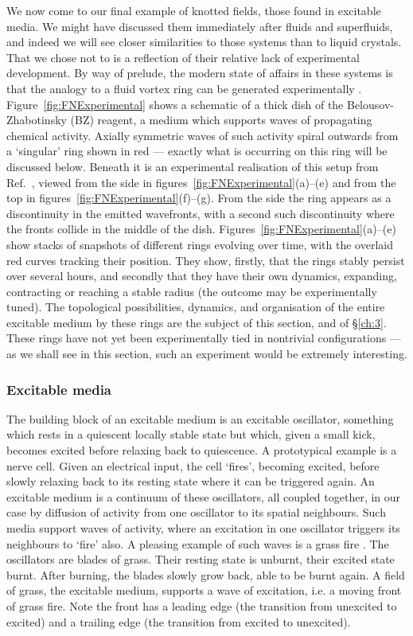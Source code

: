 We now come to our final example of knotted fields, those found in excitable media. We might have discussed them immediately after fluids and superfluids, and indeed we will see closer similarities to those systems than to liquid crystals. That we chose not to is a reflection of their relative lack of experimental development. By way of prelude, the modern state of affairs in these systems is that the analogy to a fluid vortex ring can be generated experimentally \citep{Steinbock2006,Azhand2014, Totz2015}. Figure~\ref{fig:FNExperimental} shows a schematic of a thick dish of the Belousov-Zhabotinsky (BZ) reagent, a medium which supports waves of propagating chemical activity. Axially symmetric waves of such activity spiral outwards from a `singular' ring shown in red --- exactly what is occurring on this ring will be discussed below. Beneath it is an experimental realisation of this setup from Ref.~\citep{Totz2015}, viewed from the side in figures~\ref{fig:FNExperimental}(a)--(e) and from the top in figures~\ref{fig:FNExperimental}(f)--(g). From the side the ring appears as a discontinuity in the emitted wavefronts, with a second such discontinuity where the fronts collide in the middle of the dish. Figures~\ref{fig:FNExperimental}(a)--(e) show stacks of snapshots of different rings evolving over time, with the overlaid red curves tracking their position. They show, firstly, that the rings stably persist over several hours, and secondly that they have their own dynamics, expanding, contracting or reaching a stable radius (the outcome may be experimentally tuned). The topological possibilities, dynamics, and organisation of the entire excitable medium by these rings are the subject of this section, and of \S \ref{ch:3}. These rings have not yet been experimentally tied in nontrivial configurations --- as we shall see in this section, such an experiment would be extremely interesting.

\subsubsection{Excitable media}

The building block of an excitable medium is an excitable oscillator, something which rests in a quiescent locally stable state but which, given a small kick, becomes excited before relaxing back to quiescence. A prototypical example is a nerve cell. Given an electrical input, the cell `fires', becoming excited, before slowly relaxing back to its resting state where it can be triggered again. An excitable medium is a continuum of these oscillators, all coupled together, in our case by diffusion of activity from one oscillator to its spatial neighbours. Such media support waves of activity, where an excitation in one oscillator triggers its neighbours to `fire' also. A pleasing example of such waves is a grass fire \citep{Winfree1983}. The oscillators are blades of grass. Their resting state is unburnt, their excited state burnt. After burning, the blades slowly grow back, able to be burnt again. A field of grass, the excitable medium, supports a wave of excitation, i.e. a moving front of grass fire. Note the front has a leading edge (the transition from unexcited to excited) and a trailing edge (the transition from excited to unexcited).

